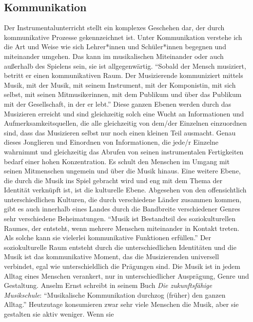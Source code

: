 \subsection{Kommunikation}
Der Instrumentalunterricht stellt ein komplexes Geschehen dar,
der durch kommunikative Prozesse gekennzeichnet ist. Unter Kommunikation
verstehe ich die Art und Weise wie sich Lehrer*innen und Schüler*innen begegnen
und miteinander umgehen. Das kann im musikalischen Miteinander oder auch
außerhalb des Spielens sein, sie ist allgegenwärtig. \enquote{Sobald der Mensch
musiziert, betritt er einen kommunikativen Raum. Der Musizierende kommuniziert
mittels Musik, mit der Musik, mit seinem Instrument, mit der Komponistin, mit
sich selbst, mit seinen Mitmusikerinnen, mit dem Publikum und über das Publikum
mit der Gesellschaft, in der er lebt.}
\autocite[56]{doerne:umfassend_musizieren} Diese ganzen Ebenen werden durch das
Musizieren erreicht und sind gleichzeitig solch eine Wucht an Informationen und
Aufmerksamkeitsquellen, die alle gleichzeitig von dem/der Einzelnen einzuordnen
sind, dass das Musizieren selbst nur noch einen kleinen Teil ausmacht. Genau
dieses Jonglieren und Einordnen von Informationen, die jede/r Einzelne wahrnimmt
und gleichzeitig das Abrufen von seinen instrumentalen Fertigkeiten bedarf einer
hohen Konzentration. Es schult den Menschen im Umgang mit seinen Mitmenschen
ungemein und über die Musik hinaus. Eine weitere Ebene, die durch die Musik ins
Spiel gebracht wird und eng mit dem Thema der Identität verknüpft ist, ist die
kulturelle Ebene. Abgesehen von den offensichtlich unterschiedlichen Kulturen,
die durch verschiedene Länder zusammen kommen, gibt es auch innerhalb eines
Landes durch die Bandbreite verschiedener Genres sehr verschiedene
Beheimatungen. \enquote{Musik ist Bestandteil des soziokulturellen Raumes, der
entsteht, wenn mehrere Menschen miteinander in Kontakt treten. Als solche kann
sie vielerlei kommunikative Funktionen erfüllen.}
\autocite[56]{doerne:umfassend_musizieren} Der soziokulturelle Raum entsteht
durch die unterschiedlichen Identitäten und die Musik ist das kommunikative
Moment, das die Musizierenden universell verbindet, egal wie unterschieldlich
die Prägungen sind. Die Musik ist in jedem Alltag eines Menschen verankert, nur
in unterschiedlicher Ausprägung, Genre und Gestaltung.
Anselm Ernst schreibt in seinem Buch \emph{Die zukunftsfähige Musikschule}:
\enquote{Musikalische Kommunikation durchzog (früher) den ganzen Alltag.}
\autocite[37]{ernst:die_zukunftsfaehige_musikschule} Heutzutage konsumieren zwar
sehr viele Menschen die Musik, aber sie gestalten sie aktiv weniger. Wenn sie
